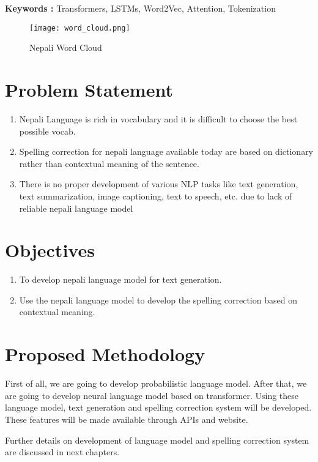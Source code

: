 \textbf{Keywords : } Transformers, LSTMs, Word2Vec, Attention, Tokenization

\begin{figure}[H]
    \centering
    \texttt{[image: word\_cloud.png]}
    \caption{Nepali Word Cloud}
    \label{fig:Nepali Word Cloud}
\end{figure}

\section{Problem Statement}
\begin{enumerate}
    \item Nepali Language is rich in vocabulary and it is difficult to choose the best possible vocab.
    \item Spelling correction for nepali language available today are based on dictionary rather than contextual meaning of the sentence.
    \item There is no proper development of various NLP tasks like text generation, text summarization, image captioning, text to speech, etc. due to lack of reliable nepali language model
\end{enumerate}

\section{Objectives}
\begin{enumerate}
    \item To develop nepali language model for text generation.
    \item Use the nepali language model to develop the spelling correction based on contextual meaning.
\end{enumerate}



\section{Proposed Methodology}
First of all, we are going to develop probabilistic language model.  After that, we are going to develop neural language model based on transformer. Using these language model, text generation and spelling correction system will be developed. These features will be made available through APIs and website.

Further details on development of language model and spelling correction system are discussed in next chapters.

